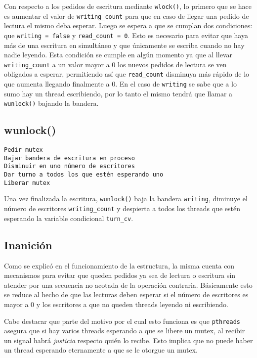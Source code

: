 \documentclass[a4paper]{article}
\begin{document}
Con respecto a los pedidos de escritura mediante \texttt{wlock()}, lo primero
que se hace es aumentar el valor de \texttt{writing\_count} para que en caso de
llegar una pedido de lectura el mismo deba esperar. Luego se espera a que se
cumplan dos condiciones: que \texttt{writing = false} y \texttt{read\_count =
0}. Esto es necesario para evitar que haya más de una escritura en simultáneo y
que únicamente se escriba cuando no hay nadie leyendo. Esta condición se cumple
en algún momento ya que al llevar \texttt{writing\_count} a un valor mayor a 0 los
nuevos pedidos de lectura se ven obligados a esperar, permitiendo así que
\texttt{read\_count} disminuya más rápido de lo que aumenta llegando finalmente
a 0. En el caso de \texttt{writing} se sabe que a lo sumo hay un thread
escribiendo, por lo tanto el mismo tendrá que llamar a \texttt{wunlock()}
bajando la bandera.

\subsection*{wunlock()}
\begin{codesnippet}
\begin{verbatim}
Pedir mutex
Bajar bandera de escritura en proceso
Disminuir en uno número de escritores
Dar turno a todos los que estén esperando uno
Liberar mutex
\end{verbatim}
\end{codesnippet}
Una vez finalizada la escritura, \texttt{wunlock()} baja la bandera
\texttt{writing}, diminuye el número de escritores \texttt{writing\_count} y
despierta a todos los threads que estén esperando la variable condicional
\texttt{turn\_cv}.

\subsection{Inanición}

Como se explicó en el funcionamiento de la estructura, la misma cuenta con
mecanismos para evitar que queden pedidos ya sea de lectura o escritura sin
atender por una secuencia no acotada de la operación contraria. Básicamente esto
se reduce al hecho de que las lecturas deben esperar si el número de escritores
es mayor a 0 y los escritores a que no queden threads leyendo ni escribiendo.

Cabe destacar que parte del motivo por el cual esto funciona es que
\texttt{pthreads} asegura que si hay varios threads esperando a que se libere un
mutex, al recibir un signal habrá \emph{justicia} respecto quién lo recibe.
Esto implica que no puede haber un thread esperando eternamente a que se le
otorgue un mutex.
\end{document}
